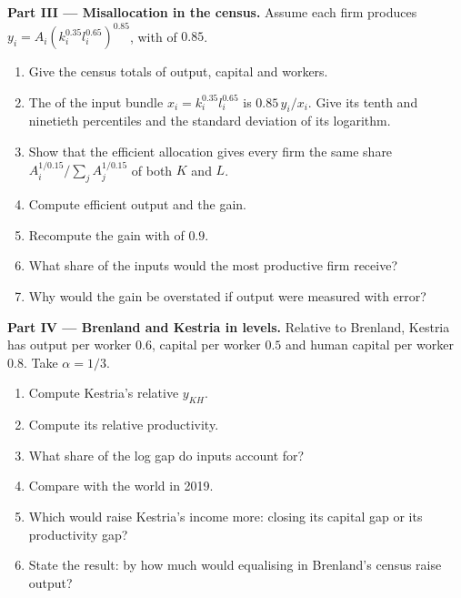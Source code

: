 \begin{problem}
\medskip\noindent\textbf{Part III --- Misallocation in the census.} Assume each
firm produces $y_i = A_i(k_i^{0.35}l_i^{0.65})^{0.85}$, with  of $0.85$.
\begin{enumerate}[resume]
  \item Give the census totals of output, capital and workers.
  \item The  of the input bundle $x_i = k_i^{0.35}l_i^{0.65}$ is $0.85\,y_i/x_i$. Give its tenth and ninetieth percentiles and the standard deviation of its logarithm.
  \item Show that the efficient allocation gives every firm the same share $A_i^{1/0.15}/\sum_j A_j^{1/0.15}$ of both $K$ and $L$.
  \item Compute efficient output and the gain.
  \item Recompute the gain with  of $0.9$.
  \item What share of the inputs would the most productive firm receive?
  \item Why would the gain be overstated if output were measured with error?
\end{enumerate}

\medskip\noindent\textbf{Part IV --- Brenland and Kestria in levels.} Relative to
Brenland, Kestria has output per worker $0.6$, capital per worker $0.5$ and
human capital per worker $0.8$. Take $\alpha = 1/3$.
\begin{enumerate}[resume]
  \item Compute Kestria's relative $y_{KH}$.
  \item Compute its relative productivity.
  \item What share of the log gap do inputs account for?
  \item Compare with the world in 2019.
  \item Which would raise Kestria's income more: closing its capital gap or its productivity gap?
  \item State the result: by how much would equalising  in Brenland's census raise output?
\end{enumerate}
\end{problem}
